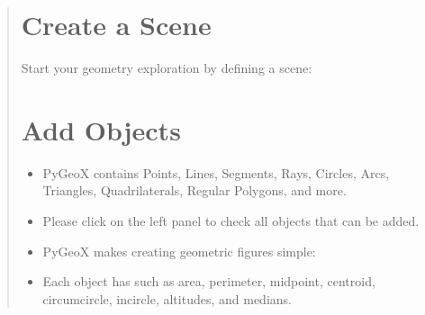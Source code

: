 \documentclass[letterpaper,10pt,english]{sphinxmanual}
\begin{document}
\begin{quote}
\section{Create a Scene}
\label{\detokenize{index:create-a-scene}}
\sphinxAtStartPar
Start your geometry exploration by defining a scene:

\begin{sphinxVerbatim}[commandchars=\\\{\}]
   

    
\end{sphinxVerbatim}


\section{Add Objects}
\label{\detokenize{index:add-objects}}\begin{itemize}
\item {} 
\sphinxAtStartPar
PyGeoX contains  Points, Lines, Segments, Rays, Circles, Arcs, Triangles, Quadrilaterals, Regular Polygons, and more.

\item {} 
\sphinxAtStartPar
Please click  on the left panel to check all objects that can be added.

\item {} 
\sphinxAtStartPar
PyGeoX makes creating geometric figures simple:

\end{itemize}

\begin{sphinxVerbatim}[commandchars=\\\{\}]
    \PYG{p}{[}  \PYG{p}{]}
    
   
\end{sphinxVerbatim}
\begin{itemize}
\item {} 
\sphinxAtStartPar
Each object has  such as area, perimeter, midpoint, centroid, circumcircle, incircle, altitudes, and medians.


\end{itemize}
\end{quote}
\end{document}

